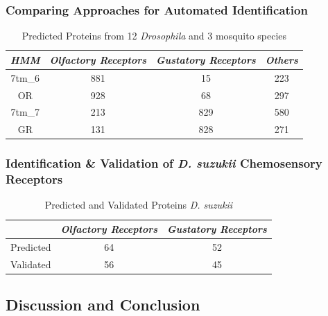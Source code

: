 \subsubsection{Comparing Approaches for Automated Identification}

\begin{table}[H]
  \centering
  \begin{tabular}{c c c c} \hline
  \emph{HMM} & \emph{Olfactory Receptors} & \emph{Gustatory Receptors} & \emph{Others} \\ \hline
  7tm\_6 & 881 & 15 & 223 \\ \hline
  OR & 928 & 68 & 297 \\ \hline
  7tm\_7 & 213 & 829 & 580 \\ \hline
  GR & 131 & 828 & 271 \\ \hline
  \end{tabular}
  \caption{Predicted Proteins from 12 \textit{Drosophila} and 3 mosquito species}
  \label{tab:chemosensory:hmm-validation}
\end{table}

\subsubsection{Identification \& Validation of \emph{D. suzukii} Chemosensory Receptors}

\begin{table}[H]
  \centering
  \begin{tabular}{c c c} \hline
  & \emph{Olfactory Receptors} & \emph{Gustatory Receptors} \\ \hline
  Predicted & 64 & 52 \\ \hline
  Validated & 56 & 45 \\ \hline 
  \end{tabular}
  \caption{Predicted and Validated Proteins \emph{D. suzukii}}
  \label{tab:chemosensory:suzukii-predictions}
\end{table}

\subsection{Discussion and Conclusion}